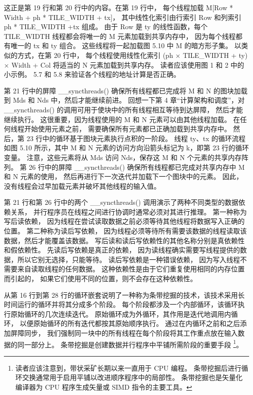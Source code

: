这正是第 19 行和第 20 行中的内容。在第 19 行中，
每个线程加载 M[Row * Width + ph * TILE\_WIDTH + tx]，
其中线性化索引由行索引 Row 和列索引 ph * TILE\_WIDTH +tx 组成。 
由于 Row 是 ty 的线性函数，每个 TILE\_WIDTH 线程都会将唯一的 M 元素加载到共享内存中，
因为每个线程都有唯一的 tx 和 ty 组合。 这些线程将一起加载图 5.10 中 M 的暗方形子集。 
以类似的方式，在第 20 行中，
每个线程使用线性化索引 (ph × TILE\_WIDTH + ty) × Width + Col 将适当的 N 元素加载到共享内存。
读者应该使用图 1 和 2 中的小示例。 5.7 和 5.8 来验证各个线程的地址计算是否正确。

第 21 行中的屏障 \_\_syncthreads() 确保所有线程都已完成将 M 和 N 的图块加载到 Mds 和 Nds 中，然后才能继续前进。 
回想一下第 4 章“计算架构和调度”，对 \_\_syncthreads() 的调用可用于使块中的所有线程相互等待到达屏障，
然后才能继续执行。 这很重要，因为线程使用的 M 和 N 元素可以由其他线程加载。 在任何线程开始使用元素之前，
需要确保所有元素都已正确加载到共享内存中。 然后，第 23 行中的循环基于图块元素执行点积的一阶段。 
线程 ty、tx 的循环流程如图 5.10 所示，其中 M 和 N 元素的访问方向沿箭头标记为 k，即第 23 行的循环变量。
注意，这些元素将从 Mds 访问 Nds，保存这 M 和 N 个元素的共享内存阵列。 
第 26 行中的屏障 \_\_syncthreads() 确保所有线程都已完成对共享内存中 M 和 N 元素的使用，
然后再进行下一次迭代并加载下一个图块中的元素。 因此，没有线程会过早加载元素并破坏其他线程的输入值。

第 21 行和第 26 行中的两个 \_\_syncthreads() 调用演示了两种不同类型的数据依赖关系，
并行程序员在线程之间进行协调时通常必须对其进行推理。 第一种称为写后读依赖，
因为线程在尝试读取数据之前必须等待其他线程将数据写入正确的位置。 第二种称为读后写依赖，
因为线程必须等待所有需要该数据的线程读取该数据，然后才能覆盖该数据。 
写后读和读后写依赖性的其他名称分别是真依赖性和假依赖性。 先读后写依赖是真正的依赖，
因为读线程确实需要写线程提供的数据，所以它别无选择，只能等待。 读后写依赖是一种错误依赖，
因为写入线程不需要来自读取线程的任何数据。 这种依赖性是由于它们重复使用相同的内存位置而引起的，
如果它们使用不同的位置，则不会存在这种依赖性。

从第 16 行到第 28 行的循环嵌套说明了一种称为条带挖掘的技术，该技术采用长时间运行的循环并将其分成多个阶段。 
每个阶段都涉及一个内部循环，该循环执行原始循环的几次连续迭代。 原始循环成为外循环，其作用是迭代地调用内循环，
以便原始循环的所有迭代都按其原始顺序执行。 通过在内循环之前和之后添加屏障同步，
我们强制同一块中的所有线程在每个阶段将其工作重点放在输入数据的同一部分上。 
条带挖掘是创建数据并行程序中平铺所需阶段的重要手段
\footnote{读者应该注意到，带状采矿长期以来一直用于 CPU 编程。 
条带挖掘后进行循环交换通常用于启用平铺以改进顺序程序中的局部性。 
条带挖掘也是矢量化编译器为 CPU 程序生成矢量或 SIMD 指令的主要工具。}。

